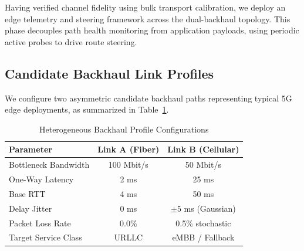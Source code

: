 \documentclass[conference]{IEEEtran}
\begin{document}
Having verified channel fidelity using bulk transport calibration, we deploy an edge telemetry and steering framework across the dual-backhaul topology. This phase decouples path health monitoring from application payloads, using periodic active probes to drive route steering.

\subsection{Candidate Backhaul Link Profiles}
We configure two asymmetric candidate backhaul paths representing typical 5G edge deployments, as summarized in Table~\ref{tab:backhaul_profiles}.

\begin{table}[htbp]
\caption{Heterogeneous Backhaul Profile Configurations}
\label{tab:backhaul_profiles}
\centering
\begin{tabular}{lcc}
\toprule
\textbf{Parameter} & \textbf{Link A (Fiber)} & \textbf{Link B (Cellular)} \\
\midrule
Bottleneck Bandwidth & 100 Mbit/s & 50 Mbit/s \\
One-Way Latency & 2 ms & 25 ms \\
Base RTT & 4 ms & 50 ms \\
Delay Jitter & 0 ms & $\pm 5$ ms (Gaussian) \\
Packet Loss Rate & 0.0\% & 0.5\% stochastic \\
Target Service Class & URLLC & eMBB / Fallback \\
\bottomrule
\end{tabular}
\end{table}
\end{document}
